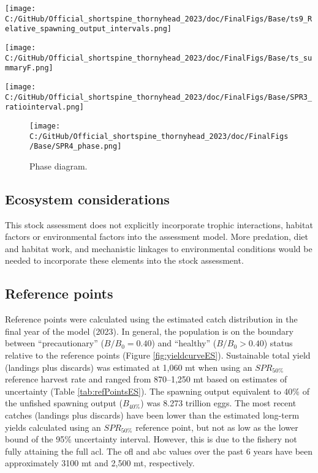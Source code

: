 \documentclass[11pt,
  english,
  letterpaper,
]{article}
\begin{document}
\texttt{[image: C:/GitHub/Official\_shortspine\_thornyhead\_2023/doc/FinalFigs/Base/ts9\_Relative\_spawning\_output\_intervals.png]} \newpage

\texttt{[image: C:/GitHub/Official\_shortspine\_thornyhead\_2023/doc/FinalFigs/Base/ts\_summaryF.png]} \newpage

\texttt{[image: C:/GitHub/Official\_shortspine\_thornyhead\_2023/doc/FinalFigs/Base/SPR3\_ratiointerval.png]} \newpage

\begin{figure}
\centering
\texttt{[image: C:/GitHub/Official\_shortspine\_thornyhead\_2023/doc/FinalFigs/Base/SPR4\_phase.png]}
\caption{Phase diagram.\label{fig:phase_diagramES}}
\end{figure}

\hypertarget{ecosystem-considerations}{%
\subsection*{Ecosystem considerations}\label{ecosystem-considerations}}

This stock assessment does not explicitly incorporate trophic interactions, habitat factors or environmental factors into the assessment model. More predation, diet and habitat work, and mechanistic linkages to environmental conditions would be needed to incorporate these elements into the stock assessment.

\hypertarget{reference-points}{%
\subsection*{Reference points}\label{reference-points}}

Reference points were calculated using the estimated catch distribution in the final year of the model (2023). In general, the population is on the boundary between ``precautionary'' (\(B/B_0 = 0.40\)) and ``healthy'' (\(B/B_0 > 0.40\)) status relative to the reference points (Figure \ref{fig:yieldcurveES}). Sustainable total yield (landings plus discards) was estimated at 1,060 mt when using an \(SPR_{50\%}\) reference harvest rate and ranged from 870--1,250 mt based on estimates of uncertainty (Table \ref{tab:refPointsES}). The spawning output equivalent to 40\% of the unfished spawning output (\(B_{40\%}\)) was 8.273 trillion eggs. The most recent catches (landings plus discards) have been lower than the estimated long-term yields calculated using an \(SPR_{50\%}\) reference point, but not as low as the lower bound of the 95\% uncertainty interval. However, this is due to the fishery not fully attaining the full \gls{acl}. The \gls{ofl} and \gls{abc} values over the past 6 years have been approximately 3100 mt and 2,500 mt, respectively.
\end{document}
